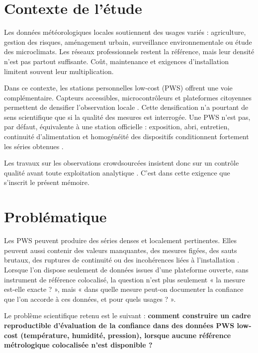 \documentclass[12pt,a4paper]{report}
\begin{document}
\section*{Contexte de l'étude}

Les données météorologiques locales soutiennent des usages variés : agriculture,
gestion des risques, aménagement urbain, surveillance environnementale ou étude
des microclimats. Les réseaux professionnels restent la référence, mais leur
densité n'est pas partout suffisante. Coût, maintenance et exigences
d'installation limitent souvent leur multiplication.

Dans ce contexte, les stations personnelles low-cost (PWS) offrent une voie
complémentaire. Capteurs accessibles, microcontrôleurs et plateformes
citoyennes permettent de densifier l'observation locale
\cite{moon2017microclimate,teh2020sensor}. Cette densification n'a pourtant de
sens scientifique que si la qualité des mesures est interrogée. Une PWS n'est
pas, par défaut, équivalente à une station officielle : exposition, abri,
entretien, continuité d'alimentation et homogénéité des dispositifs
conditionnent fortement les séries obtenues
\cite{devos2019qc,teh2020sensor}.

Les travaux sur les observations crowdsourcées insistent donc sur un contrôle
qualité avant toute exploitation analytique \cite{devos2019qc,dabrowski2022qc}.
C'est dans cette exigence que s'inscrit le présent mémoire.

\section*{Problématique}

Les PWS peuvent produire des séries denses et localement pertinentes. Elles
peuvent aussi contenir des valeurs manquantes, des mesures figées, des sauts
brutaux, des ruptures de continuité ou des incohérences liées à l'installation
\cite{teh2020sensor,devos2019qc}. Lorsque l'on dispose seulement de données
issues d'une plateforme ouverte, sans instrument de référence colocalisé, la
question n'est plus seulement « la mesure est-elle exacte ? », mais « dans
quelle mesure peut-on documenter la confiance que l'on accorde à ces données,
et pour quels usages ? ».

Le problème scientifique retenu est le suivant : \textbf{comment construire un
cadre reproductible d'évaluation de la confiance dans des données PWS low-cost
(température, humidité, pression), lorsque aucune référence métrologique
colocalisée n'est disponible ?}
\end{document}
